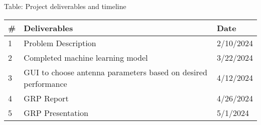 \documentclass[12pt, letterpaper, notitlepage]{article}
\begin{document}
\centering
Table: Project deliverables and timeline\\
\noindent\begin{tabularx}{\textwidth}{|X|X|X|} \hline
  \textbf{\#} & \textbf{Deliverables} & \textbf{Date} \\ \hline \hline
  1 & Problem Description & 2/10/2024\\ \hline
  2 & Completed machine learning model & 3/22/2024\\ \hline
  3 & GUI to choose antenna parameters based on desired performance & 4/12/2024\\ \hline
  4 & GRP Report & 4/26/2024\\ \hline
  5 & GRP Presentation & 5/1/2024\\ \hline
\end{tabularx}



\end{document}
